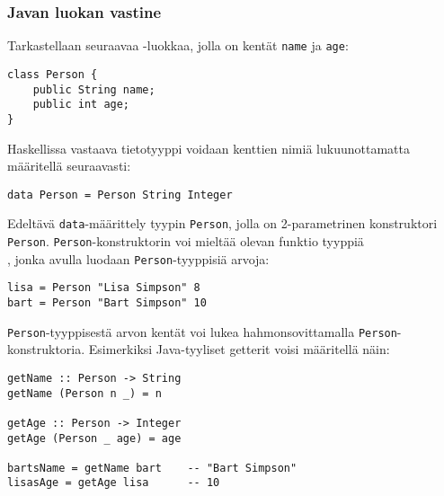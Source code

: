 \subsubsection{Javan luokan vastine}
Tarkastellaan seuraavaa -luokkaa, jolla on kentät \texttt{name} ja \texttt{age}:
\begin{verbatim}
class Person {
    public String name;
    public int age;
}
\end{verbatim}
Haskellissa vastaava tietotyyppi voidaan kenttien nimiä lukuunottamatta määritellä seuraavasti:
\begin{verbatim}
data Person = Person String Integer
\end{verbatim}
Edeltävä \texttt{data}-määrittely tyypin \texttt{Person}, jolla on 2-parametrinen konstruktori \texttt{Person}.
\texttt{Person}-konstruktorin voi mieltää olevan funktio tyyppiä\\ , jonka avulla luodaan \texttt{Person}-tyyppisiä arvoja:
\begin{verbatim}
lisa = Person "Lisa Simpson" 8
bart = Person "Bart Simpson" 10
\end{verbatim}
\texttt{Person}-tyyppisestä arvon kentät voi lukea hahmonsovittamalla \texttt{Person}-konstruktoria.
Esimerkiksi Java-tyyliset getterit voisi määritellä näin:
\begin{verbatim}
getName :: Person -> String
getName (Person n _) = n

getAge :: Person -> Integer
getAge (Person _ age) = age

bartsName = getName bart    -- "Bart Simpson"
lisasAge = getAge lisa      -- 10
\end{verbatim}


